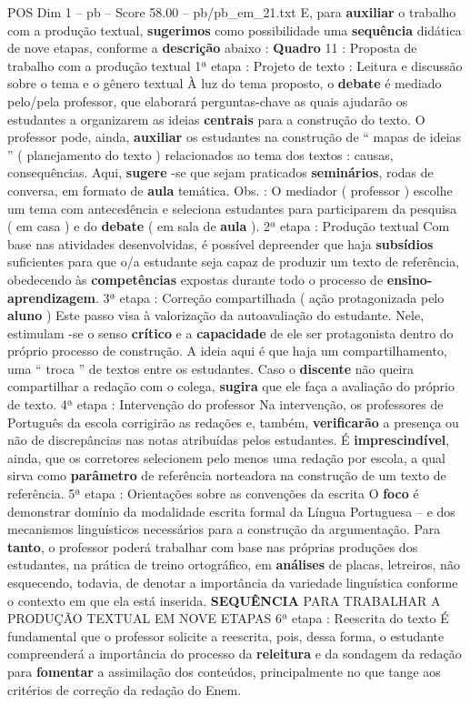 \begin{textsample}{POS Dim 1 – pb – Score 58.00 – pb/pb\_em\_21.txt}
E, para \textbf{auxiliar} o trabalho com a produção textual, \textbf{sugerimos} como possibilidade uma \textbf{sequência} didática de nove etapas, conforme a \textbf{descrição} abaixo : \textbf{Quadro} 11 : Proposta de trabalho com a produção textual 1ª etapa : Projeto de texto : Leitura e discussão sobre o tema e o gênero textual À luz do tema proposto, o \textbf{debate} é mediado pelo/pela professor, que elaborará perguntas-chave as quais ajudarão os estudantes a organizarem as ideias \textbf{centrais} para a construção do texto.
O professor pode, ainda, \textbf{auxiliar} os estudantes na construção de “ mapas de ideias ” ( planejamento do texto ) relacionados ao tema dos textos : causas, consequências.
Aqui, \textbf{sugere} -se que sejam praticados \textbf{seminários}, rodas de conversa, em formato de \textbf{aula} temática.
Obs. : O mediador ( professor ) escolhe um tema com antecedência e seleciona estudantes para participarem da pesquisa ( em casa ) e do \textbf{debate} ( em sala de \textbf{aula} ). 2ª etapa : Produção textual Com base nas atividades desenvolvidas, é possível depreender que haja \textbf{subsídios} suficientes para que o/a estudante seja capaz de produzir um texto de referência, obedecendo às \textbf{competências} expostas durante todo o processo de \textbf{ensino-aprendizagem}. 3ª etapa : Correção compartilhada ( ação protagonizada pelo \textbf{aluno} ) Este passo visa à valorização da autoavaliação do estudante.
Nele, estimulam -se o senso \textbf{crítico} e a \textbf{capacidade} de ele ser protagonista dentro do próprio processo de construção.
A ideia aqui é que haja um compartilhamento, uma “ troca ” de textos entre os estudantes.
Caso o \textbf{discente} não queira compartilhar a redação com o colega, \textbf{sugira} que ele faça a avaliação do próprio de texto. 4ª etapa : Intervenção do professor Na intervenção, os professores de Português da escola corrigirão as redações e, também, \textbf{verificarão} a presença ou não de discrepâncias nas notas atribuídas pelos estudantes.
É \textbf{imprescindível}, ainda, que os corretores selecionem pelo menos uma redação por escola, a qual sirva como \textbf{parâmetro} de referência norteadora na construção de um texto de referência. 5ª etapa : Orientações sobre as convenções da escrita O \textbf{foco} é demonstrar domínio da modalidade escrita formal da Língua Portuguesa – e dos mecanismos linguísticos necessários para a construção da argumentação.
Para \textbf{tanto}, o professor poderá trabalhar com base nas próprias produções dos estudantes, na prática de treino ortográfico, em \textbf{análises} de placas, letreiros, não esquecendo, todavia, de denotar a importância da variedade linguística conforme o contexto em que ela está inserida. \textbf{SEQUÊNCIA} PARA TRABALHAR A PRODUÇÃO TEXTUAL EM NOVE ETAPAS 6ª etapa : Reescrita do texto É fundamental que o professor solicite a reescrita, pois, dessa forma, o estudante compreenderá a importância do processo da \textbf{releitura} e da sondagem da redação para \textbf{fomentar} a assimilação dos conteúdos, principalmente no que tange aos critérios de correção da redação do Enem.

\end{textsample}
